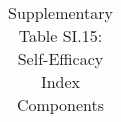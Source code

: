 \begin{longtable}{llcccccccccc}
\caption{Supplementary Table SI.15: Self-Efficacy Index Components} \label{tab:pap__b4_2a} \\                                                                                                                                                                                                                                                                                                                                                                                                                                                                                                                                                                                                                                                                                                                                                                                             
\hline \hline                                                                                                                                                                                                                                                                                                                                                                                                                                                                                                                                                                                                                                                                                                                                                                                                                                                                             

\end{longtable}
